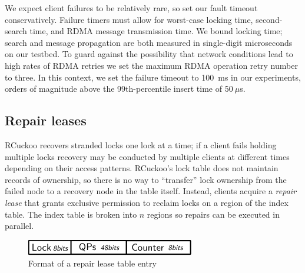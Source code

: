 We expect client failures to be relatively rare, so set
our fault timeout conservatively. Failure timers must allow for
worst-case locking time, second-search time, and RDMA message
transmission time. We bound locking time;
search and message propagation are both measured in single-digit
microseconds on our testbed.  To guard against the possibility that
network conditions lead to high rates of RDMA retries we set
the maximum RDMA operation retry number to three.  In
this context, we set the failure timeout to 100~ms in our experiments,
orders of magnitude above the 99th-percentile insert time
of 50$~\mu$s.


\subsection{Repair leases}

RCuckoo recovers stranded locks one lock at a time; if a client fails
holding multiple locks recovery may be conducted by multiple clients
at different times depending on their access patterns.  RCuckoo's lock
table does not maintain records of ownership, so there is no way to
``transfer'' lock ownership from the failed node to a recovery node in
the table itself.  Instead, clients acquire a \emph{repair lease} that
grants exclusive permission to reclaim locks on a region of the index
table. The index table is broken into $n$ regions so repairs can be
executed in parallel.

\begin{figure}[t]
    \centering
        \includegraphics[width=0.99\linewidth]{fig/lease.pdf}
    \caption{Format of a repair lease table entry}
    \label{fig:lease}
   \vspace{-1em}
\end{figure}

